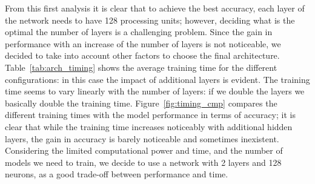 \begin{table}
\centering
{}
\caption{LSTM architectures comparison.}
\label{tab:arch_results}
\end{table}

From this first analysis it is clear that to achieve the best accuracy, each layer of the network needs to have 128 processing units; however, deciding what is the optimal the number of layers is a challenging problem. Since the gain in performance with an increase of the number of layers is not noticeable, we decided to take into account other factors to choose the final architecture. Table~\ref{tab:arch_timing} shows the average training time for the different configurations: in this case the impact of additional layers is evident. The training time seems to vary linearly with the number of layers: if we double the layers we basically double the training time.
Figure~\ref{fig:timing_cmp} compares the different training times with the model performance in terms of accuracy;
it is clear that while the training time increases noticeably with additional hidden layers, the gain in accuracy is barely noticeable and sometimes inexistent. Considering the limited computational power and time, and the number of models we need to train, we decide to use a network with 2 layers and 128 neurons, as a good trade-off between performance and time.

